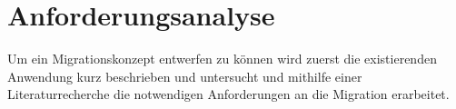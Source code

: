 \section{Anforderungsanalyse}

Um ein Migrationskonzept entwerfen zu können wird zuerst die existierenden Anwendung kurz beschrieben und untersucht und mithilfe einer Literaturrecherche die notwendigen Anforderungen an die Migration erarbeitet.